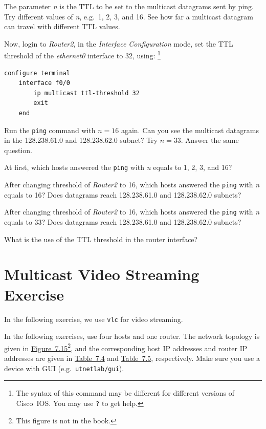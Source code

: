 \documentclass{../UTNetLab}
\begin{document}
    The parameter \textit{n} is the TTL to be set to the multicast datagrams sent by ping.
    Try different values of \textit{n}, e.g.\ 1, 2, 3, and 16.
    See how far a multicast datagram can travel with different TTL values. 

    Now, login to \textit{Router2}, in the \textit{Interface Configuration} mode, set the TTL threshold of the \textit{ethernet0} interface to 32, using:%
    \footnote{The syntax of this command may be different for different versions of Cisco~IOS. You may use \lstinline[language={cisco}]{?} to get help.}
    \begin{lstlisting}[language={cisco}]    
configure terminal
    interface f0/0
        ip multicast ttl-threshold 32
        exit
    end
    \end{lstlisting}

    Run the \lstinline{ping} command with $n = 16$ again.
    Can you see the multicast datagrams in the 128.238.61.0 and 128.238.62.0 subnet?
    Try $n = 33$.
    Answer the same question.
    
    \begin{report}
    \item At first, which hosts answered the \lstinline{ping} with \textit{n} equals to 1, 2, 3, and 16?
    \item After changing threshold of \textit{Router2} to 16, which hosts answered the \lstinline{ping} with \textit{n} equals to 16?
    Does datagrams reach 128.238.61.0 and 128.238.62.0 subnets?
    \item After changing threshold of \textit{Router2} to 16, which hosts answered the \lstinline{ping} with \textit{n} equals to 33?
    Does datagrams reach 128.238.61.0 and 128.238.62.0 subnets?
    
    \item What is the use of the TTL threshold in the router interface?
    \end{report}

\part{Multicast Video Streaming Exercise\label{sec:multicast-streaming}}
    In the following exercise, we use \lstinline{vlc} for video streaming.
    
    In the following exercises, use four hosts and one router. The network topology is given in \hyperref[fig:7.15]{Figure~7.15}\footnote{This figure is not in the book.}, and the corresponding host IP addresses and router IP addresses are given in \hyperref[tab:7.4]{Table~7.4} and \hyperref[tab:7.5]{Table~7.5}, respectively.
    Make sure you use a device with GUI (e.g.\ \texttt{utnetlab/gui}).
\end{document}
